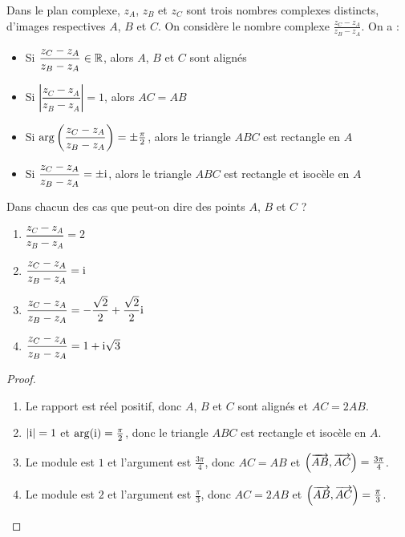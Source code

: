 \begin{methode}
Dans le plan complexe, $z_A$, $z_B$ et $z_C$ sont trois nombres complexes distincts, d'images respectives $A$, $B$ et $C$. On considère le nombre complexe $\frac{z_C - z_A}{z_B - z_A}$. On a :

\begin{itemize}
\item Si $\dfrac{z_C - z_A}{z_B - z_A} \in \mathbb{R}$, alors $A$, $B$ et $C$ sont alignés
\item Si $\left|\dfrac{z_C - z_A}{z_B - z_A}\right| = 1$, alors $AC = AB$
\item Si $\arg\left(\dfrac{z_C - z_A}{z_B - z_A}\right) = \pm\frac{\pi}{2}$, alors le triangle $ABC$ est rectangle en $A$
\item Si $\dfrac{z_C - z_A}{z_B - z_A} = \pm\text{i}$, alors le triangle $ABC$ est rectangle et isocèle en $A$
\end{itemize}
\end{methode}

\begin{example}
Dans chacun des cas que peut-on dire des points $A$, $B$ et $C$ ?
\begin{enumerate}
\item $\dfrac{z_C - z_A}{z_B - z_A} = 2$
\item $\dfrac{z_C - z_A}{z_B - z_A} = \text{i}$
\item $\dfrac{z_C - z_A}{z_B - z_A} = -\dfrac{\sqrt{2}}{2} + \dfrac{\sqrt{2}}{2}\text{i}$
\item $\dfrac{z_C - z_A}{z_B - z_A} = 1 + \text{i}\sqrt{3}$
\end{enumerate}

\begin{proof}
\begin{enumerate}
\item Le rapport est réel positif, donc $A$, $B$ et $C$ sont alignés et $AC = 2AB$.
\item $|\text{i}| = 1$ et $\arg(\text{i}) = \frac{\pi}{2}$, donc le triangle $ABC$ est rectangle et isocèle en $A$.
\item Le module est $1$ et l'argument est $\frac{3\pi}{4}$, donc $AC = AB$ et $\left(\overrightarrow{AB}, \overrightarrow{AC}\right) = \frac{3\pi}{4}$.
\item Le module est $2$ et l'argument est $\frac{\pi}{3}$, donc $AC = 2AB$ et $\left(\overrightarrow{AB}, \overrightarrow{AC}\right) = \frac{\pi}{3}$.
\end{enumerate}
\end{proof}
\end{example}





